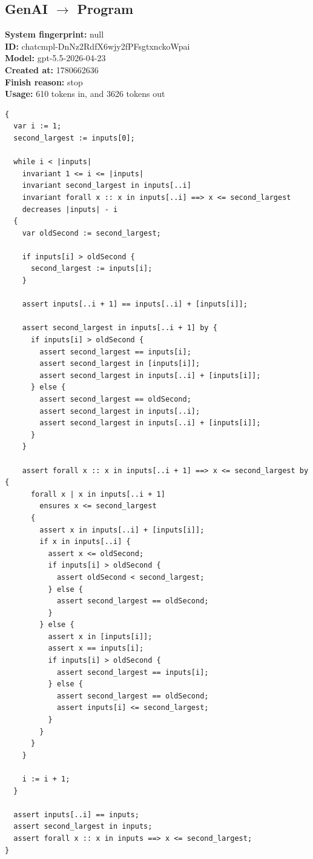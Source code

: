 \documentclass{article}
\begin{document}
\subsection*{GenAI $\rightarrow$ Program}
\textbf{System fingerprint: }null
\\\textbf{ID: }chatcmpl-DnNz2RdfX6wjy2fPFsgtxnckoWpai
\\\textbf{Model: }gpt-5.5-2026-04-23
\\\textbf{Created at: }1780662636
\\\textbf{Finish reason: }stop
\\\textbf{Usage: }610 tokens in, and 3626 tokens out
\begin{lstlisting}
{
  var i := 1;
  second_largest := inputs[0];

  while i < |inputs|
    invariant 1 <= i <= |inputs|
    invariant second_largest in inputs[..i]
    invariant forall x :: x in inputs[..i] ==> x <= second_largest
    decreases |inputs| - i
  {
    var oldSecond := second_largest;

    if inputs[i] > oldSecond {
      second_largest := inputs[i];
    }

    assert inputs[..i + 1] == inputs[..i] + [inputs[i]];

    assert second_largest in inputs[..i + 1] by {
      if inputs[i] > oldSecond {
        assert second_largest == inputs[i];
        assert second_largest in [inputs[i]];
        assert second_largest in inputs[..i] + [inputs[i]];
      } else {
        assert second_largest == oldSecond;
        assert second_largest in inputs[..i];
        assert second_largest in inputs[..i] + [inputs[i]];
      }
    }

    assert forall x :: x in inputs[..i + 1] ==> x <= second_largest by {
      forall x | x in inputs[..i + 1]
        ensures x <= second_largest
      {
        assert x in inputs[..i] + [inputs[i]];
        if x in inputs[..i] {
          assert x <= oldSecond;
          if inputs[i] > oldSecond {
            assert oldSecond < second_largest;
          } else {
            assert second_largest == oldSecond;
          }
        } else {
          assert x in [inputs[i]];
          assert x == inputs[i];
          if inputs[i] > oldSecond {
            assert second_largest == inputs[i];
          } else {
            assert second_largest == oldSecond;
            assert inputs[i] <= second_largest;
          }
        }
      }
    }

    i := i + 1;
  }

  assert inputs[..i] == inputs;
  assert second_largest in inputs;
  assert forall x :: x in inputs ==> x <= second_largest;
}
\end{lstlisting}
\end{document}
